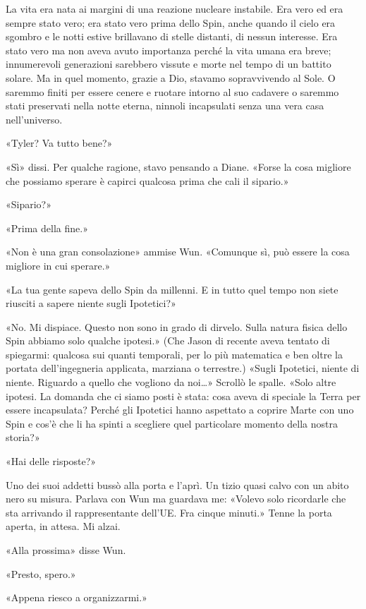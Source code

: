 La vita era nata ai margini di una reazione nucleare instabile. Era vero
ed era sempre stato vero; era stato vero prima dello Spin, anche quando
il cielo era sgombro e le notti estive brillavano di stelle distanti, di
nessun interesse. Era stato vero ma non aveva avuto importanza perché la
vita umana era breve; innumerevoli generazioni sarebbero vissute e morte
nel tempo di un battito solare. Ma in quel momento, grazie a Dio,
stavamo sopravvivendo al Sole. O saremmo finiti per essere cenere e
ruotare intorno al suo cadavere o saremmo stati preservati nella notte
eterna, ninnoli incapsulati senza una vera casa nell'universo.

«Tyler? Va tutto bene?»

«Sì» dissi. Per qualche ragione, stavo pensando a Diane. «Forse la cosa
migliore che possiamo sperare è capirci qualcosa prima che cali il
sipario.»

«Sipario?»

«Prima della fine.»

«Non è una gran consolazione» ammise Wun. «Comunque sì, può essere la
cosa migliore in cui sperare.»

«La tua gente sapeva dello Spin da millenni. E in tutto quel tempo non
siete riusciti a sapere niente sugli Ipotetici?»

«No. Mi dispiace. Questo non sono in grado di dirvelo. Sulla natura
fisica dello Spin abbiamo solo qualche ipotesi.» (Che Jason di recente
aveva tentato di spiegarmi: qualcosa sui quanti temporali, per lo più
matematica e ben oltre la portata dell'ingegneria applicata, marziana o
terrestre.) «Sugli Ipotetici, niente di niente. Riguardo a quello che
vogliono da noi\ldots» Scrollò le spalle. «Solo altre ipotesi. La
domanda che ci siamo posti è stata: cosa aveva di speciale la Terra per
essere incapsulata? Perché gli Ipotetici hanno aspettato a coprire Marte
con uno Spin e cos'è che li ha spinti a scegliere quel particolare
momento della nostra storia?»

«Hai delle risposte?»

Uno dei suoi addetti bussò alla porta e l'aprì. Un tizio quasi calvo con
un abito nero su misura. Parlava con Wun ma guardava me: «Volevo solo
ricordarle che sta arrivando il rappresentante dell'UE. Fra cinque
minuti.» Tenne la porta aperta, in attesa. Mi alzai.

«Alla prossima» disse Wun.

«Presto, spero.»

«Appena riesco a organizzarmi.»

